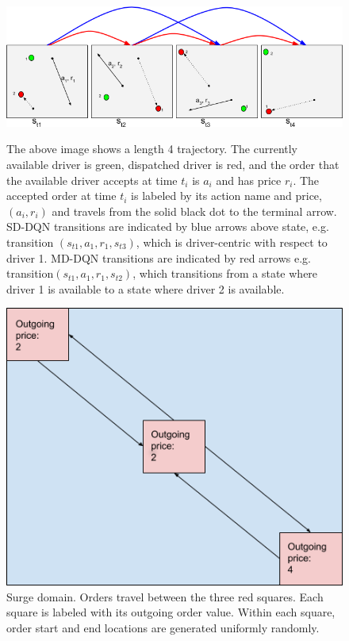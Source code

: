\begin{figure}[H]
\begin{floatrow}
\centering
\includegraphics[width=1.\linewidth]{sections/mddqn/figures/dqn_state_transitions_cropped.png}\label{fig:dqn_trans}
\caption{The above image shows a length 4 trajectory. The currently available driver is green, dispatched driver is red, and the order that the available driver accepts at time $t_i$ is $a_i$ and has price $r_i$. The accepted order at time $t_i$ is labeled by its action name and price, $(a_i, r_i)$ and travels from the solid black dot to the terminal arrow. SD-DQN transitions are indicated by blue arrows above state, e.g. transition $(s_{t1}, a_1, r_1, s_{t3})$, which is driver-centric with respect to driver 1. MD-DQN transitions are indicated by red arrows e.g. transition$(s_{t1}, a_1, r_1, s_{t2})$, which transitions from a state where driver 1 is available to a state where driver 2 is available.}
\end{floatrow}
\end{figure}

\begin{figure}[H]
\begin{floatrow}
\centering
\includegraphics[width=.75\linewidth]{sections/mddqn/figures/Bonus_cropped.png}
\caption{Surge domain. Orders travel between the three red squares. Each square is labeled with its outgoing order value. Within each square, order start and end locations are generated uniformly randomly.}
\label{fig:surge}
\end{floatrow}
\end{figure}


